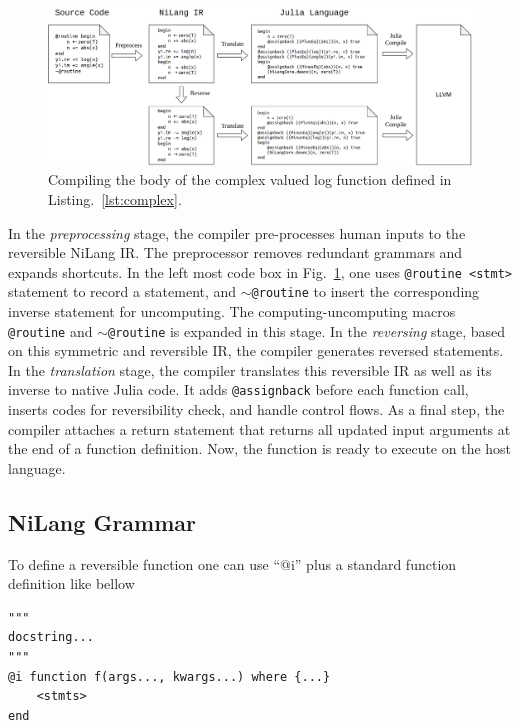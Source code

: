 \documentclass{article}
\newcommand{\<}{\langle}
\renewcommand{\>}{\rangle}
\newcommand{\Fig}[1]{Fig.~\ref{#1}}
\newcommand{\Lst}[1]{Listing.~\ref{#1}}
\theoremstyle{definition}\newtheorem{definition}{\textit{Definition}}
\begin{document}
\begin{figure}
    \centerline{\includegraphics[width=0.95\columnwidth,trim={0cm 0cm 0cm 0cm},clip]{compiling_v2.pdf}}
    \caption{Compiling the body of the complex valued log function defined in \Lst{lst:complex}.}\label{fig:compiling}
\end{figure}

In the \textit{preprocessing} stage, the compiler pre-processes human inputs to the reversible NiLang IR.
The preprocessor removes redundant grammars and expands shortcuts. In the left most code box in \Fig{fig:compiling}, one uses \texttt{@routine <stmt>} statement to record a statement, and \texttt{$\sim$@routine} to insert the corresponding inverse statement for uncomputing.
The computing-uncomputing macros \texttt{@routine} and \texttt{$\sim$@routine} is expanded in this stage.
In the \textit{reversing} stage, based on this symmetric and reversible IR, the compiler generates reversed statements.
In the \textit{translation} stage, the compiler translates this reversible IR as well as its inverse to native Julia code. It adds \texttt{@assignback} before each function call, inserts codes for reversibility check, and handle control flows.
As a final step, the compiler attaches a return statement that returns all updated input arguments at the end of a function definition.
Now, the function is ready to execute on the host language.


\subsection{NiLang Grammar}\label{app:grammar}
To define a reversible function one can use ``@i'' plus a standard function definition like bellow

\begin{minipage}{.88\columnwidth}
\begin{lstlisting}[basicstyle=\small\ttfamily,columns=fullflexible]
"""
docstring...
"""
@i function f(args..., kwargs...) where {...}
    <stmts>
end
\end{lstlisting}
\end{minipage}
\end{document}
